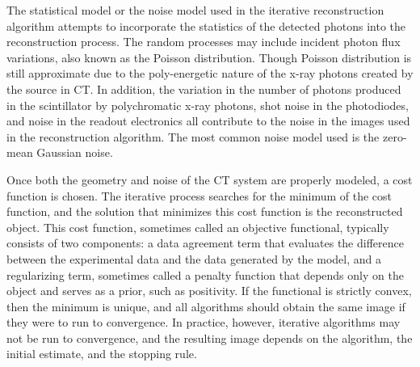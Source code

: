 The statistical model or the noise model used in the iterative reconstruction algorithm attempts to incorporate the statistics of the detected photons into the reconstruction process.  The random processes may include incident photon flux variations, also known as the Poisson distribution.  Though Poisson distribution is still approximate due to the poly-energetic nature of the x-ray photons created by the source in CT.  In addition, the variation in the number of photons produced in the scintillator by polychromatic x-ray photons, shot noise in the photodiodes, and noise in the readout electronics all contribute to the noise in the images used in the reconstruction algorithm.  The most common noise model used is the zero-mean Gaussian noise.

\clearpage

Once both the geometry and noise of the CT system are properly modeled, a cost function is chosen.  The iterative process searches for the minimum of the cost function, and the solution that minimizes this cost function is the reconstructed object.  This cost function, sometimes called an objective functional, typically consists of two components: a data agreement term that evaluates the difference between the experimental data and the data generated by the model, and a regularizing term, sometimes called a penalty function that depends only on the object and serves as a prior, such as positivity.  If the functional is strictly convex, then the minimum is unique, and all algorithms should obtain the same image if they were to run to convergence.  In practice, however, iterative algorithms may not be run to convergence, and the resulting image depends on the algorithm, the initial estimate, and the stopping rule.

